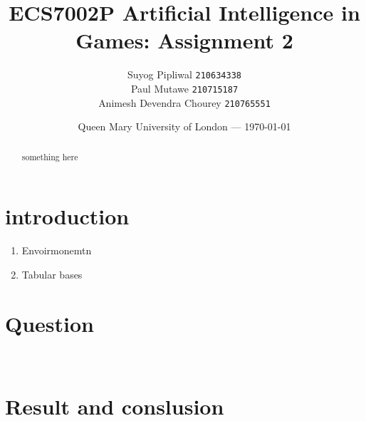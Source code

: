 \documentclass[11pt]{article}
\title{ECS7002P Artificial Intelligence in Games: Assignment 2} %
\author{Suyog Pipliwal \texttt{210634338}\\ 
			Paul Mutawe \texttt{210715187} \\ 
			Animesh Devendra Chourey \texttt{210765551}
} %
\date{Queen Mary University of London --- \today} %
\begin{document}
	\maketitle
\begin{abstract}
	something here
\end{abstract}
\section{introduction}
	\begin{enumerate}
		\item Envoirmonemtn
		\item Tabular bases
			\
	\end{enumerate}
\section {Question}
\
\section{Result and conslusion}
\section {}
\end{document}
